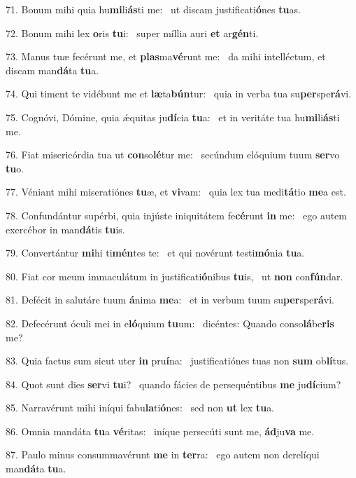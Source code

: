71. Bonum mihi quia hu\textbf{mi}li\textbf{ás}ti me: \ast\  ut discam justificati\textbf{ó}nes \textbf{tu}as.\

72. Bonum mihi lex \textbf{o}ris \textbf{tu}i: \ast\  super míllia auri \textbf{et} ar\textbf{gén}ti.\

73. Manus tuæ fecérunt me, et \textbf{plas}ma\textbf{vé}runt me: \ast\  da mihi intelléctum, et discam man\textbf{dá}ta \textbf{tu}a.\

74. Qui timent te vidébunt me et \textbf{læ}ta\textbf{bún}tur: \ast\  quia in verba tua su\textbf{per}spe\textbf{rá}vi.\

75. Cognóvi, Dómine, quia ǽquitas ju\textbf{dí}cia \textbf{tu}a: \ast\  et in veritáte tua hu\textbf{mi}li\textbf{ás}ti me.\

76. Fiat misericórdia tua ut \textbf{con}so\textbf{lé}tur me: \ast\  secúndum elóquium tuum \textbf{ser}vo \textbf{tu}o.\

77. Véniant mihi miseratiónes \textbf{tu}æ, et \textbf{vi}vam: \ast\  quia lex tua medi\textbf{tá}tio \textbf{me}a est.\

78. Confundántur supérbi, quia injúste iniquitátem fe\textbf{cé}runt \textbf{in} me: \ast\  ego autem exercébor in man\textbf{dá}tis \textbf{tu}is.\

79. Convertántur \textbf{mi}hi ti\textbf{mén}tes te: \ast\  et qui novérunt testi\textbf{mó}nia \textbf{tu}a.\

80. Fiat cor meum immaculátum in justificati\textbf{ó}nibus \textbf{tu}is, \ast\  ut \textbf{non} con\textbf{fún}dar.\

81. Defécit in salutáre tuum \textbf{á}nima \textbf{me}a: \ast\  et in verbum tuum su\textbf{per}spe\textbf{rá}vi.\

82. Defecérunt óculi mei in e\textbf{ló}quium \textbf{tu}um: \ast\  dicéntes: Quando conso\textbf{lá}be\textbf{ris} me?\

83. Quia factus sum sicut uter \textbf{in} pru\textbf{í}na: \ast\  justificatiónes tuas non \textbf{sum} ob\textbf{lí}tus.\

84. Quot sunt dies \textbf{ser}vi \textbf{tu}i? \ast\  quando fácies de persequéntibus \textbf{me} ju\textbf{dí}cium?\

85. Narravérunt mihi iníqui fabu\textbf{la}ti\textbf{ó}nes: \ast\  sed non \textbf{ut} lex \textbf{tu}a.\

86. Omnia mandáta \textbf{tu}a \textbf{vé}ritas: \ast\  iníque persecúti sunt me, \textbf{ád}ju\textbf{va} me.\

87. Paulo minus consummavérunt \textbf{me} in \textbf{ter}ra: \ast\  ego autem non derelíqui man\textbf{dá}ta \textbf{tu}a.\

